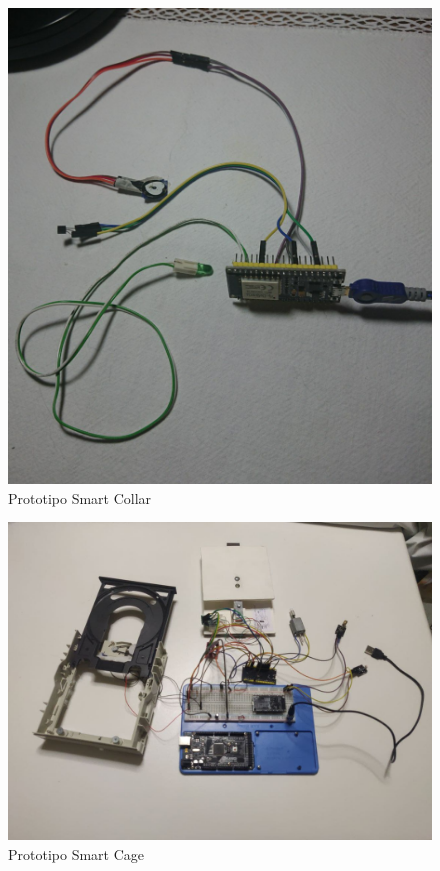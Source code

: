         \begin{figure}[H]
            \caption{Prototipo Smart Collar}
            \label{fig:SmartCollar}
            \centering
            \includegraphics[width=1\textwidth]{Images/SmartCollar.jpeg}
        \end{figure}
        
        \begin{figure}[H]
            \caption{Prototipo Smart Cage}
            \label{fig:SmartCage}
            \centering
            \includegraphics[width=1\textwidth]{Images/SmartCage.png}
        \end{figure}